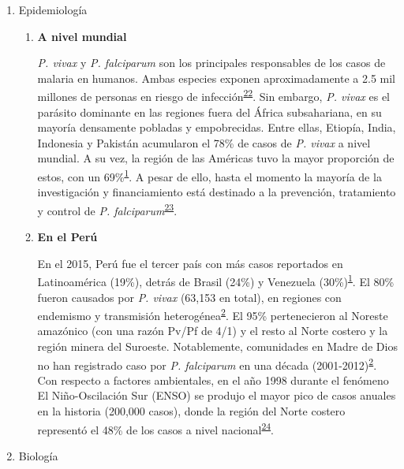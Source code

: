 \documentclass[a4paper]{article}
\begin{document}
\begin{enumerate}
\def\labelenumi{\alph{enumi}.}
\item
  Epidemiología

  \begin{enumerate}
  \def\labelenumii{\roman{enumii}.}
  \item
    \textbf{A nivel mundial}

    \emph{P. vivax} y \emph{P. falciparum} son los principales
    responsables de los casos de malaria en humanos. Ambas especies
    exponen aproximadamente a 2.5 mil millones de personas en riesgo de
    infección\textsuperscript{\protect\hyperlink{ref-howes2016global}{22}}.
    Sin embargo, \emph{P. vivax} es el parásito dominante en las
    regiones fuera del África subsahariana, en su mayoría densamente
    pobladas y empobrecidas. Entre ellas, Etiopía, India, Indonesia y
    Pakistán acumularon el 78\% de casos de \emph{P. vivax} a nivel
    mundial. A su vez, la región de las Américas tuvo la mayor
    proporción de estos, con un
    69\%\textsuperscript{\protect\hyperlink{ref-WHO2016world}{1}}. A
    pesar de ello, hasta el momento la mayoría de la investigación y
    financiamiento está destinado a la prevención, tratamiento y control
    de \emph{P.
    falciparum}\textsuperscript{\protect\hyperlink{ref-path2011}{23}}.
  \item
    \textbf{En el Perú}

    En el 2015, Perú fue el tercer país con más casos reportados en
    Latinoamérica (19\%), detrás de Brasil (24\%) y Venezuela
    (30\%)\textsuperscript{\protect\hyperlink{ref-WHO2016world}{1}}. El
    80\% fueron causados por \emph{P. vivax} (63,153 en total), en
    regiones con endemismo y transmisión
    heterogénea\textsuperscript{\protect\hyperlink{ref-rosas2016peru}{2}}.
    El 95\% pertenecieron al Noreste amazónico (con una razón Pv/Pf de
    4/1) y el resto al Norte costero y la región minera del Suroeste.
    Notablemente, comunidades en Madre de Dios no han registrado caso
    por \emph{P. falciparum} en una década
    (2001-2012)\textsuperscript{\protect\hyperlink{ref-rosas2016peru}{2}}.
    Con respecto a factores ambientales, en el año 1998 durante el
    fenómeno El Niño-Oscilación Sur (ENSO) se produjo el mayor pico de
    casos anuales en la historia (200,000 casos), donde la región del
    Norte costero representó el 48\% de los casos a nivel
    nacional\textsuperscript{\protect\hyperlink{ref-gagnon2002enso}{24}}.
  \end{enumerate}
\item
  Biología


\end{enumerate}
\end{document}
